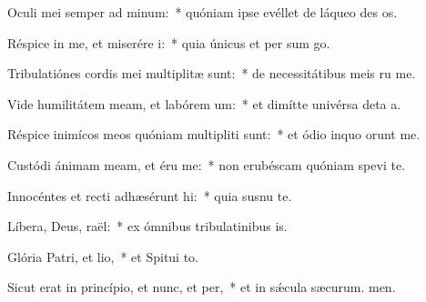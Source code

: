 \item Oculi mei semper ad minum:~* quóniam ipse evéllet de láqueo des os.
\item Réspice in me, et miserére i:~* quia únicus et per sum go.
\item Tribulatiónes cordis mei multiplitæ sunt:~* de necessitátibus meis ru me.
\item Vide humilitátem meam, et labórem um:~* et dimítte univérsa deta a.
\item Réspice inimícos meos quóniam multipliti sunt:~* et ódio inquo orunt me.
\item Custódi ánimam meam, et éru me:~* non erubéscam quóniam spevi  te.
\item Innocéntes et recti adhæsérunt hi:~* quia susnu te.
\item Líbera, Deus, raël:~* ex ómnibus tribulatinibus is.
\item Glória Patri, et lio,~* et Spitui to.
\item Sicut erat in princípio, et nunc, et per,~* et in sǽcula sæcurum. men.
